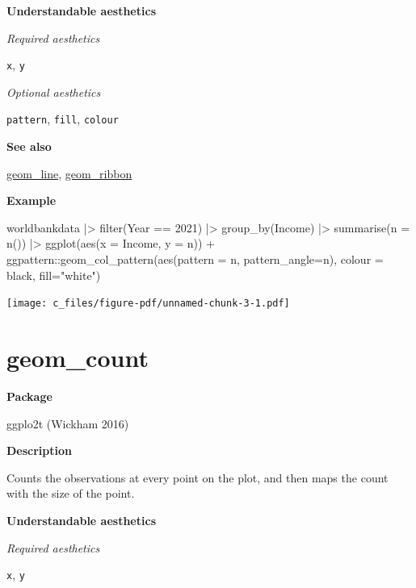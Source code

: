 \documentclass[
  letterpaper,
  DIV=11,
  numbers=noendperiod]{scrreprt}
\newenvironment{Shaded}{\begin{snugshade}}{\end{snugshade}}
\newcommand{\AttributeTok}[1]{\textcolor[rgb]{0.40,0.45,0.13}{#1}}
\newcommand{\DecValTok}[1]{\textcolor[rgb]{0.68,0.00,0.00}{#1}}
\newcommand{\FunctionTok}[1]{\textcolor[rgb]{0.28,0.35,0.67}{#1}}
\newcommand{\NormalTok}[1]{\textcolor[rgb]{0.00,0.23,0.31}{#1}}
\newcommand{\SpecialCharTok}[1]{\textcolor[rgb]{0.37,0.37,0.37}{#1}}
\newcommand{\StringTok}[1]{\textcolor[rgb]{0.13,0.47,0.30}{#1}}
\begin{document}
\textbf{Understandable aesthetics}

\emph{Required aesthetics}

\texttt{x}, \texttt{y}

\emph{Optional aesthetics}

\texttt{pattern}, \texttt{fill}, \texttt{colour}

\textbf{See also}

\hyperref[line]{geom\_line}, \hyperref[ribbon]{geom\_ribbon}

\textbf{Example}

\begin{Shaded}
\begin{Highlighting}[]
\NormalTok{worldbankdata }\SpecialCharTok{|\textgreater{}}
  \FunctionTok{filter}\NormalTok{(Year }\SpecialCharTok{==} \DecValTok{2021}\NormalTok{) }\SpecialCharTok{|\textgreater{}}
  \FunctionTok{group\_by}\NormalTok{(Income) }\SpecialCharTok{|\textgreater{}}
  \FunctionTok{summarise}\NormalTok{(}\AttributeTok{n =} \FunctionTok{n}\NormalTok{()) }\SpecialCharTok{|\textgreater{}}
  \FunctionTok{ggplot}\NormalTok{(}\FunctionTok{aes}\NormalTok{(}\AttributeTok{x =}\NormalTok{ Income, }\AttributeTok{y =}\NormalTok{ n)) }\SpecialCharTok{+}  
\NormalTok{  ggpattern}\SpecialCharTok{::}\FunctionTok{geom\_col\_pattern}\NormalTok{(}\FunctionTok{aes}\NormalTok{(}\AttributeTok{pattern =}\NormalTok{ n, }\AttributeTok{pattern\_angle=}\NormalTok{n),}
    \AttributeTok{colour  =} \StringTok{\textquotesingle{}black\textquotesingle{}}\NormalTok{, }\AttributeTok{fill=}\StringTok{"white"}\NormalTok{) }
\end{Highlighting}
\end{Shaded}

\texttt{[image: c\_files/figure-pdf/unnamed-chunk-3-1.pdf]}

\section{geom\_count}\label{count}

\textbf{Package}

ggplo2t (Wickham 2016)

\textbf{Description}

Counts the observations at every point on the plot, and then maps the
count with the size of the point.

\textbf{Understandable aesthetics}

\emph{Required aesthetics}

\texttt{x}, \texttt{y}
\end{document}
